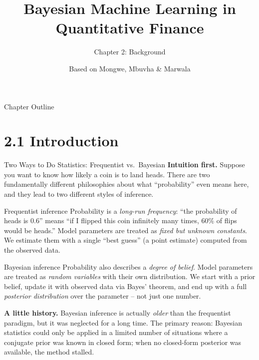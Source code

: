 \documentclass[aspectratio=169,10pt]{beamer}
\title[Bayesian ML in QF -- Ch.2]{Bayesian Machine Learning in Quantitative Finance}
\subtitle{Chapter 2: Background}
\author{Based on Mongwe, Mbuvha \& Marwala}
\institute{Springer, 2025}
\date{}
\begin{document}

\begin{frame}
  \titlepage
\end{frame}

\begin{frame}{Chapter Outline}
  \tableofcontents
\end{frame}

\section{2.1 Introduction}

\begin{frame}[allowframebreaks]{Two Ways to Do Statistics: Frequentist vs.\ Bayesian}
  \textbf{Intuition first.} Suppose you want to know how likely a coin is to
  land heads. There are two fundamentally different philosophies about what
  ``probability'' even means here, and they lead to two different styles of
  inference.

  \begin{block}{Frequentist inference}
    Probability is a \emph{long-run frequency}: ``the probability of heads is
    $0.6$'' means ``if I flipped this coin infinitely many times, $60\%$ of
    flips would be heads.'' Model parameters are treated as \emph{fixed but
    unknown constants}. We estimate them with a single ``best guess'' (a
    point estimate) computed from the observed data.
  \end{block}

  \begin{block}{Bayesian inference}
    Probability also describes a \emph{degree of belief}. Model parameters
    are treated as \emph{random variables} with their own distribution. We
    start with a prior belief, update it with observed data via Bayes'
    theorem, and end up with a full \emph{posterior distribution} over the
    parameter -- not just one number.
  \end{block}

  \framebreak

  \textbf{A little history.} Bayesian inference is actually \emph{older}
  than the frequentist paradigm, but it was neglected for a long time. The
  primary reason: Bayesian statistics could only be applied in a limited
  number of situations where a conjugate prior was known in closed form; when
  no closed-form posterior was available, the method stalled.


\end{frame}
\end{document}
